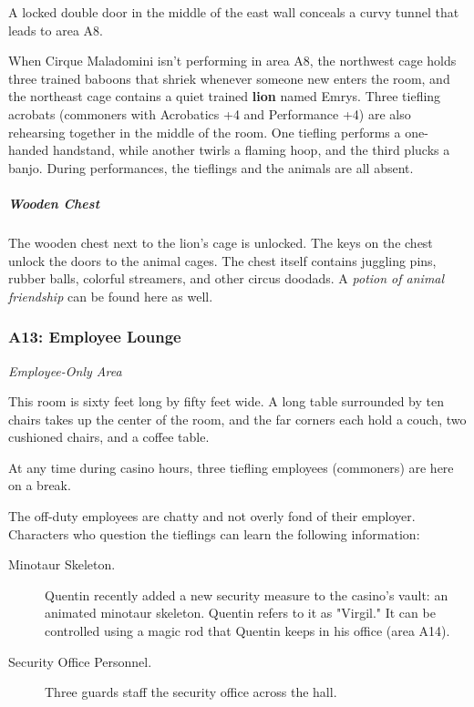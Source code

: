 \documentclass[10pt,a4paper,twoside,bg=print,twocolumn,openany,nodeprecatedcode]{dndbook}
\begin{document}
A locked double door in the middle of the east wall conceals a curvy tunnel that leads to area A8.

When Cirque Maladomini isn't performing in area A8, the northwest cage holds three trained baboons that shriek whenever someone new enters the room, and the northeast cage contains a quiet trained \textbf{lion} named Emrys. Three tiefling acrobats (commoners with Acrobatics +4 and Performance +4) are also rehearsing together in the middle of the room. One tiefling performs a one-handed handstand, while another twirls a flaming hoop, and the third plucks a banjo. During performances, the tieflings and the animals are all absent.

\subparagraph{Wooden Chest}
The wooden chest next to the lion's cage is unlocked. The keys on the chest unlock the doors to the animal cages. The chest itself contains juggling pins, rubber balls, colorful streamers, and other circus doodads. A \textit{potion of animal friendship} can be found here as well.

\subsubsection{A13: Employee Lounge}
\textit{Employee-Only Area}

\begin{DndReadAloud}{}
This room is sixty feet long by fifty feet wide. A long table surrounded by ten chairs takes up the center of the room, and the far corners each hold a couch, two cushioned chairs, and a coffee table.

\end{DndReadAloud}

At any time during casino hours, three tiefling employees (commoners) are here on a break.

The off-duty employees are chatty and not overly fond of their employer. Characters who question the tieflings can learn the following information:


\begin{description}
\item[Minotaur Skeleton.]
Quentin recently added a new security measure to the casino's vault: an animated minotaur skeleton. Quentin refers to it as "Virgil." It can be controlled using a magic rod that Quentin keeps in his office (area A14).
\item[Security Office Personnel.]
Three guards staff the security office across the hall.
\end{description}
\end{document}
